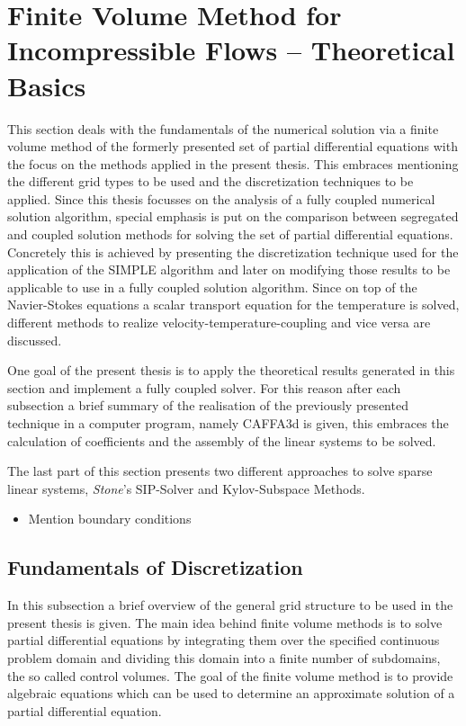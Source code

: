   \section{Finite Volume Method for Incompressible Flows -- Theoretical Basics}

  This section deals with the fundamentals of the numerical solution via a finite volume method of the formerly presented set of partial differential equations with the focus on the methods applied in the present thesis. This embraces mentioning the different grid types to be used and the discretization techniques to be applied. Since this thesis focusses on the analysis of a fully coupled numerical solution algorithm, special emphasis is put on the comparison between segregated and coupled solution methods for solving the set of partial differential equations. Concretely this is achieved by presenting the discretization technique used for the application of the SIMPLE algorithm and later on modifying those results to be applicable to use in a fully coupled solution algorithm. Since on top of the Navier-Stokes equations a scalar transport equation for the temperature is solved, different methods to realize velocity-temperature-coupling and vice versa are discussed. 
    
  One goal of the present thesis is to apply the theoretical results generated in this section and implement a fully coupled solver. For this reason after each subsection a brief summary of the realisation of the previously presented technique in a computer program, namely CAFFA3d is given, this embraces the calculation of coefficients and the assembly of the linear systems to be solved.

  The last part of this section presents two different approaches to solve sparse linear systems, \textit{Stone}'s SIP-Solver and Kylov-Subspace Methods.

  \begin{itemize}
    \item Mention boundary conditions
  \end{itemize}

  \subsection{Fundamentals of Discretization}

    In this subsection a brief overview of the general grid structure to be used in the present thesis is given. The main idea behind finite volume methods is to solve partial differential equations by integrating them over the specified continuous problem domain and dividing this domain into a finite number of subdomains, the so called control volumes. The goal of the finite volume method is to provide algebraic equations which can be used to determine an approximate solution of a partial differential equation.
      
